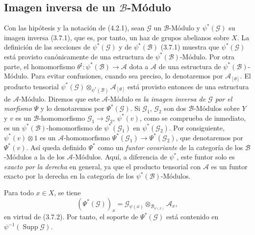 \subsection{Imagen inversa de un $\mathcal{B}$-Módulo}
\label{subsection:0.4.3-fr}

\begin{env}[4.3.1]
\label{0.4.3.1-fr}
Con las hipótesis y la notación de (4.2.1), sean $\mathcal{G}$ un
$\mathcal{B}$-Módulo y $\psi^*(\mathcal{G})$ su imagen inversa (3.7.1), que
es, por tanto, un haz de grupos abelianos sobre $X$. La definición de las
secciones de $\psi^*(\mathcal{G})$ y de $\psi^*(\mathcal{B})$ (3.7.1)
muestra que $\psi^*(\mathcal{G})$ está provisto canónicamente de una
estructura de $\psi^*(\mathcal{B})$-Módulo. Por otra parte, el
homomorfismo $\theta^\sharp:\psi^*(\mathcal{B})\to\mathcal{A}$ dota a
$\mathcal{A}$ de una estructura de $\psi^*(\mathcal{B})$-Módulo. Para
evitar confusiones, cuando sea preciso, lo denotaremos por
$\mathcal{A}_{[\theta]}$. El producto tensorial
$\psi^*(\mathcal{G})\otimes_{\psi^*(\mathcal{B})}\mathcal{A}_{[\theta]}$
está provisto entonces de una estructura de $\mathcal{A}$-Módulo.
Diremos que este $\mathcal{A}$-Módulo es \emph{la imagen
inversa de $\mathcal{G}$ por el morfismo}
$\Psi$ y lo denotaremos por $\Psi^*(\mathcal{G})$. Si $\mathcal{G}_1$,
$\mathcal{G}_2$ son dos $\mathcal{B}$-Módulos sobre $Y$ y $v$ es un
$\mathcal{B}$-homomorfismo $\mathcal{G}_1\to\mathcal{G}_2$,
$\psi^*(v)$, como se comprueba de inmediato, es un
$\psi^*(\mathcal{B})$-homomorfismo de $\psi^*(\mathcal{G}_1)$ en
$\psi^*(\mathcal{G}_2)$. Por consiguiente, $\psi^*(v)\otimes1$ es un
$\mathcal{A}$-homomorfismo $\Psi^*(\mathcal{G}_1)\to\Psi^*(\mathcal{G}_2)$,
que denotaremos por $\Psi^*(v)$. Así queda definido $\Psi^*$ como un
\emph{funtor covariante} de la categoría de los $\mathcal{B}$-Módulos a la
de los $\mathcal{A}$-Módulos. Aquí, a diferencia de $\psi^*$, este funtor
solo es \emph{exacto por la derecha} en general, ya que el producto tensorial
con $\mathcal{A}$ es un funtor exacto por la derecha en la categoría de los
$\psi^*(\mathcal{B})$-Módulos.

Para todo $x\in X$, se tiene
\[
  (\Psi^*(\mathcal{G}))_x
  =\mathcal{G}_{\psi(x)}\otimes_{\mathcal{B}_{\psi(x)}}\mathcal{A}_x,
\]
en virtud de (3.7.2). Por tanto, el soporte de $\Psi^*(\mathcal{G})$ está
contenido en $\psi^{-1}(\operatorname{Supp}\mathcal{G})$.
\end{env}
